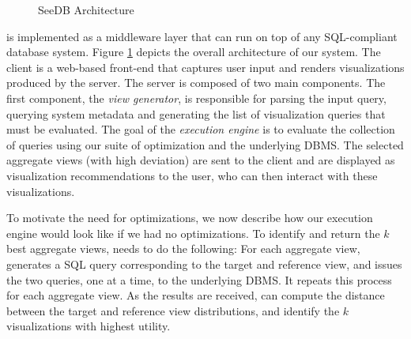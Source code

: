 \begin{figure}[htb]
\vspace{-10pt}
\centerline{
\hbox{}}
\vspace{-18pt}
\caption{SeeDB Architecture}
\label{fig:sys-arch}
\vspace{-12pt}
\end{figure} 


\SeeDB is implemented as a middleware layer that can run on
top of any SQL-compliant database system. 
Figure \ref{fig:sys-arch} depicts the overall architecture of our
system.  The \SeeDB client is a web-based front-end that captures user
input and renders visualizations produced by the \SeeDB server.  The
\SeeDB server is composed of two main components. The first
component, the {\it view generator}, is responsible for parsing the
input query, querying system metadata and generating the list of
visualization queries that must be evaluated.  
The goal of the {\em execution engine} is to evaluate the collection of queries
 using our suite of optimization and
the underlying DBMS.
The selected aggregate views (with high deviation) 
are sent to the \SeeDB client 
and are displayed as visualization recommendations to the user, 
who can then interact with these
visualizations.

To motivate the need for optimizations, we now describe 
how our execution engine would look like if we had no optimizations. 
To identify and return the $k$ best aggregate views,
\SeeDB needs to do the following:
For each aggregate view, \SeeDB generates
a SQL query corresponding to the target
and reference view, and issues
the two queries, one at a time, to the underlying DBMS.
It repeats this process for each aggregate view.
As the results are received, \SeeDB can compute the
distance between the target and reference view
distributions, and identify the $k$ visualizations
with highest utility. 

